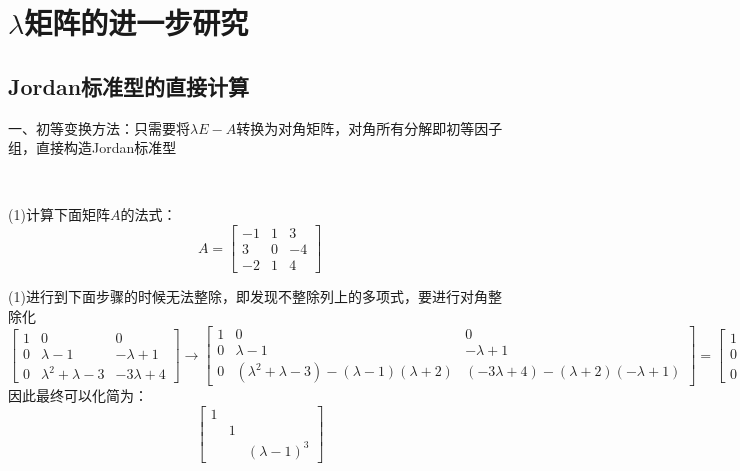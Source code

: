 \section{$\lambda$矩阵的进一步研究}

\subsection{Jordan标准型的直接计算}

一、初等变换方法：只需要将$\lambda E - A$转换为对角矩阵，对角所有分解即初等因子组，直接构造Jordan标准型

~

\begin{exercise}[无法直接整除的情况]
  (1)计算下面矩阵$A$的法式：
  \begin{equation*}
    A = \left[
      \begin{array}{ccc}
        -1&1&3 \\
          3&0&-4 \\
          -2&1&4
      \end{array}
    \right]
  \end{equation*}
\end{exercise}

\begin{solution}
  (1)进行到下面步骤的时候无法整除，即发现不整除列上的多项式，要进行对角整除化
  \begin{equation*}
    \left[
      \begin{array}{ccc}
        1&0&0 \\
         0&\lambda-1&-\lambda+1 \\
         0&\lambda^2 + \lambda - 3&-3\lambda + 4
      \end{array}
    \right] \rightarrow \left[
      \begin{array}{ccc}
        1&0&0 \\
         0&\lambda - 1&- \lambda + 1 \\
         0&(\lambda^2 + \lambda - 3) - (\lambda-1)(\lambda+2)&(-3\lambda + 4) - (\lambda+2)(-\lambda + 1)
      \end{array}
    \right] = \left[
      \begin{array}{ccc}
        1&0&0 \\
         0&\lambda - 1&-\lambda + 1 \\
         0&-1&\lambda^2 - 2\lambda +2
      \end{array}
    \right]
  \end{equation*}
  因此最终可以化简为：
  \begin{equation*}
    \left[
      \begin{array}{ccc}
        1&& \\
         &1& \\
         &&(\lambda-1)^3
      \end{array}
    \right]
  \end{equation*}
\end{solution}

